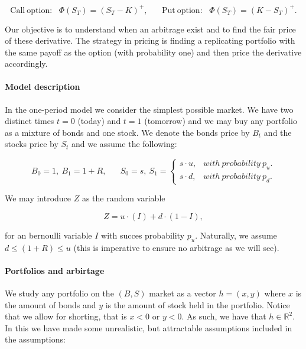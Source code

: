 \documentclass[
]{article}
\begin{document}
\[\text{Call}\ \text{option:}\hspace{10pt}\Phi(S_T)=(S_T-K)^+,\hspace{20pt}\text{Put}\ \text{option:}\hspace{10pt}\Phi(S_T)=(K-S_T)^+.\]

Our objective is to understand when an arbitrage exist and to find the
fair price of these derivative. The strategy in pricing is finding a
replicating portfolio with the same payoff as the option (with
probability one) and then price the derivative accordingly.

\hypertarget{model-description}{%
\paragraph{Model description}\label{model-description}}

In the one-period model we consider the simplest possible market. We
have two distinct times \(t=0\) (today) and \(t=1\) (tomorrow) and we
may buy any portfolio as a mixture of bonds and one stock. We denote the
bonds price by \(B_t\) and the stocks price by \(S_t\) and we assume the
following:

\[
B_0=1,\ B_1=1+R,\hspace{20pt}S_0=s,\ S_1=\left\{\begin{matrix}s\cdot u, & with\ probability\ p_u.\\s\cdot d, & with\ probability\ p_d.\end{matrix}\right.
\]

We may introduce \(Z\) as the random variable

\[
Z=u\cdot (I)+d\cdot (1-I),
\]

for an bernoulli variable \(I\) with succes probability \(p_u\).
Naturally, we assume \(d\le (1+R)\le u\) (this is imperative to ensure
no arbitrage as we will see).

\hypertarget{portfolios-and-arbirtage}{%
\paragraph{Portfolios and arbirtage}\label{portfolios-and-arbirtage}}

We study any portfolio on the \((B,S)\) market as a vector \(h=(x,y)\)
where \(x\) is the amount of bonds and \(y\) is the amount of stock held
in the portfolio. Notice that we allow for shorting, that is \(x<0\) or
\(y<0\). As such, we have that \(h\in \mathbb{R}^2\). In this we have
made some unrealistic, but attractable assumptions included in the
assumptions:
\end{document}
